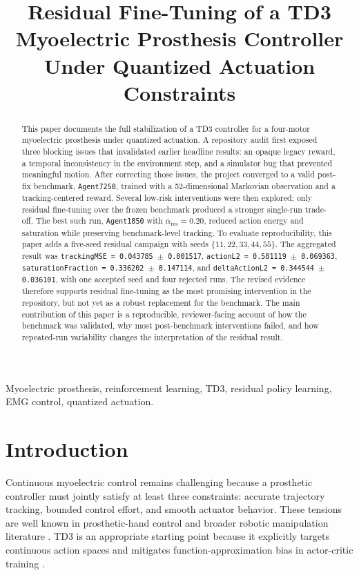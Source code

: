 \documentclass[conference]{IEEEtran}
\title{Residual Fine-Tuning of a TD3 Myoelectric Prosthesis Controller\\Under Quantized Actuation Constraints}
\author{
\IEEEauthorblockN{C\'esar Zapata}
\IEEEauthorblockA{Research Laboratory in Artificial Intelligence and Computer Vision ``Alan Turing''\\
Escuela Polit\'ecnica Nacional\\
Quito, Ecuador}
}
\begin{document}
\maketitle

\begin{abstract}
This paper documents the full stabilization of a TD3 controller for a four-motor myoelectric prosthesis under quantized actuation. A repository audit first exposed three blocking issues that invalidated earlier headline results: an opaque legacy reward, a temporal inconsistency in the environment step, and a simulator bug that prevented meaningful motion. After correcting those issues, the project converged to a valid post-fix benchmark, \texttt{Agent7250}, trained with a 52-dimensional Markovian observation and a tracking-centered reward. Several low-risk interventions were then explored; only residual fine-tuning over the frozen benchmark produced a stronger single-run trade-off. The best such run, \texttt{Agent1850} with $\alpha_{\mathrm{res}}=0.20$, reduced action energy and saturation while preserving benchmark-level tracking. To evaluate reproducibility, this paper adds a five-seed residual campaign with seeds $\{11,22,33,44,55\}$. The aggregated result was \texttt{trackingMSE = 0.043785 $\pm$ 0.001517}, \texttt{actionL2 = 0.581119 $\pm$ 0.069363}, \texttt{saturationFraction = 0.336202 $\pm$ 0.147114}, and \texttt{deltaActionL2 = 0.344544 $\pm$ 0.036101}, with one accepted seed and four rejected runs. The revised evidence therefore supports residual fine-tuning as the most promising intervention in the repository, but not yet as a robust replacement for the benchmark. The main contribution of this paper is a reproducible, reviewer-facing account of how the benchmark was validated, why most post-benchmark interventions failed, and how repeated-run variability changes the interpretation of the residual result.
\end{abstract}

\begin{IEEEkeywords}
Myoelectric prosthesis, reinforcement learning, TD3, residual policy learning, EMG control, quantized actuation.
\end{IEEEkeywords}

\section{Introduction}
Continuous myoelectric control remains challenging because a prosthetic controller must jointly satisfy at least three constraints: accurate trajectory tracking, bounded control effort, and smooth actuator behavior. These tensions are well known in prosthetic-hand control and broader robotic manipulation literature \cite{chen2023review,done2025prostheticrl}. TD3 is an appropriate starting point because it explicitly targets continuous action spaces and mitigates function-approximation bias in actor-critic training \cite{fujimoto2018td3}.
\end{document}
